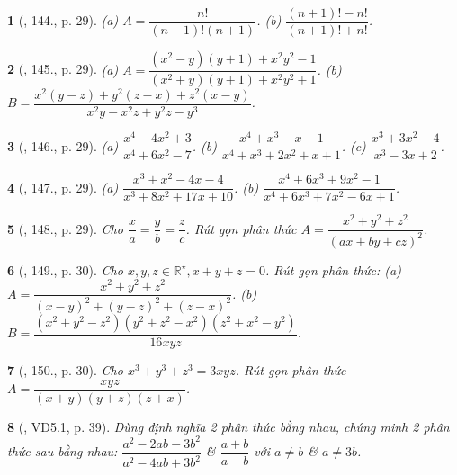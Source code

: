 \documentclass{article}
\newtheorem{baitoan}{}
\begin{document}
\begin{baitoan}[\cite{Tuyen_Toan_8}, 144., p. 29]
	(a) $A = \dfrac{n!}{(n - 1)!(n + 1)}$. (b) $\dfrac{(n + 1)! - n!}{(n + 1)! + n!}$.	
\end{baitoan}

\begin{baitoan}[\cite{Tuyen_Toan_8}, 145., p. 29]
	(a) $A = \dfrac{(x^2 - y)(y + 1) + x^2y^2 - 1}{(x^2 + y)(y + 1) + x^2y^2 + 1}$. (b) $B = \dfrac{x^2(y - z) + y^2(z - x) + z^2(x - y)}{x^2y - x^2z + y^2z - y^3}$.	
\end{baitoan}

\begin{baitoan}[\cite{Tuyen_Toan_8}, 146., p. 29]
	(a) $\dfrac{x^4 - 4x^2 + 3}{x^4 + 6x^2 - 7}$. (b) $\dfrac{x^4 + x^3 - x - 1}{x^4 + x^3 + 2x^2 + x + 1}$. (c) $\dfrac{x^3 + 3x^2 - 4}{x^3 - 3x + 2}$.	
\end{baitoan}

\begin{baitoan}[\cite{Tuyen_Toan_8}, 147., p. 29]
	(a) $\dfrac{x^3 + x^2 - 4x - 4}{x^3 + 8x^2 + 17x + 10}$. (b) $\dfrac{x^4 + 6x^3 + 9x^2 - 1}{x^4 + 6x^3 + 7x^2 - 6x + 1}$.	
\end{baitoan}

\begin{baitoan}[\cite{Tuyen_Toan_8}, 148., p. 29]
	Cho $\dfrac{x}{a} = \dfrac{y}{b} = \dfrac{z}{c}$. Rút gọn phân thức $A = \dfrac{x^2 + y^2 + z^2}{(ax + by + cz)^2}$.
\end{baitoan}

\begin{baitoan}[\cite{Tuyen_Toan_8}, 149., p. 30]
	Cho $x,y,z\in\mathbb{R}^\star,x + y + z = 0$. Rút gọn phân thức: (a) $A = \dfrac{x^2 + y^2 + z^2}{(x - y)^2 + (y - z)^2 + (z - x)^2}$. (b) $B = \dfrac{(x^2 + y^2 - z^2)(y^2 + z^2 - x^2)(z^2 + x^2 - y^2)}{16xyz}$.	
\end{baitoan}

\begin{baitoan}[\cite{Tuyen_Toan_8}, 150., p. 30]
	Cho $x^3 + y^3 + z^3 = 3xyz$. Rút gọn phân thức $A = \dfrac{xyz}{(x + y)(y + z)(z + x)}$.
\end{baitoan}

\begin{baitoan}[\cite{TLCT_THCS_Toan_8_dai_so}, VD5.1, p. 39]
	Dùng định nghĩa 2 phân thức bằng nhau, chứng minh 2 phân thức sau bằng nhau: $\dfrac{a^2 - 2ab - 3b^2}{a^2 - 4ab + 3b^2}$ \& $\dfrac{a + b}{a - b}$ với $a\ne b$ \& $a\ne 3b$.
\end{baitoan}
\end{document}
